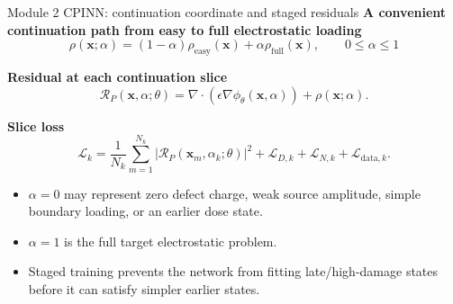 \documentclass[aspectratio=169,10pt]{beamer}
\begin{document}
\begin{frame}{Module 2 CPINN: continuation coordinate and staged residuals}
\footnotesize
\textbf{A convenient continuation path from easy to full electrostatic loading}
\vspace{-0.25em}
\begin{equation*}
\boxed{
\rho(\mathbf x;\alpha)
=(1-\alpha)\rho_{\mathrm{easy}}(\mathbf x)
+\alpha\rho_{\mathrm{full}}(\mathbf x),
\qquad 0\leq\alpha\leq1
}
\end{equation*}

\vspace{-0.15em}
\textbf{Residual at each continuation slice}
\vspace{-0.25em}
\begin{equation*}
\mathcal R_P(\mathbf x,\alpha;\theta)
=\nabla\cdot\left(\epsilon\nabla\phi_{\theta}(\mathbf x,\alpha)\right)+\rho(\mathbf x;\alpha).
\end{equation*}

\vspace{-0.2em}
\textbf{Slice loss}
\vspace{-0.25em}
\begin{equation*}
\mathcal L_k
=\frac{1}{N_k}\sum_{m=1}^{N_k}
\left|\mathcal R_P(\mathbf x_m,\alpha_k;\theta)\right|^2
+\mathcal L_{D,k}+\mathcal L_{N,k}+\mathcal L_{\mathrm{data},k}.
\end{equation*}

\vspace{-0.2em}
\begin{itemize}
    \item $\alpha=0$ may represent zero defect charge, weak source amplitude, simple boundary loading, or an earlier dose state.
    \item $\alpha=1$ is the full target electrostatic problem.
    \item Staged training prevents the network from fitting late/high-damage states before it can satisfy simpler earlier states.
\end{itemize}
\end{frame}
\end{document}
